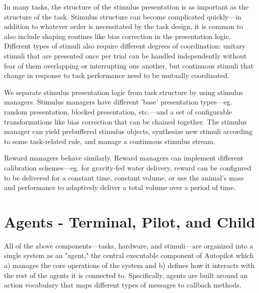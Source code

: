 \documentclass[nohyper, justified, notitlepage, marginals=raggedright,twoside=false,debug]{tufte-autopilot}
\begin{document}
In many tasks, the structure of the stimulus presentation is as important as the structure of the task. Stimulus structure can become complicated quickly---in addition to whatever order is necessitated by the task design, it is common to also include shaping routines like bias correction in the presentation logic. Different types of stimuli also require different degrees of coordination: unitary stimuli that are presented once per trial can be handled independently without fear of them overlapping  or interrupting one another, but continuous stimuli that change in response to task performance need to be mutually coordinated. 

We separate stimulus presentation logic from task structure by using stimulus managers. Stimulus managers have different 'base' presentation types---eg. random presentation, blocked presentation, etc.---and a set of configurable transformations like bias correction that can be chained together. The stimulus manager can yield prebuffered stimulus objects, synthesize new stimuli according to some task-related rule, and manage a continuous stimulus stream. 

Reward managers behave similarly. Reward managers can implement different calibration schemes---eg. for gravity-fed water delivery, reward can be configured to be delivered for a constant time, constant volume, or use the animal's mass and performance to adaptively deliver a total volume over a period of time.

\section{Agents - Terminal, Pilot, and Child}
\label{sec:agents}

All of the above components---tasks, hardware, and stimuli---are organized into a single system as an "agent," the central executable component of Autopilot which a) manages the core operations of the system and b) defines how it interacts with the rest of the agents it is connected to. Specifically, agents are built around an action vocabulary that  maps different types of messages to callback methods.
\end{document}
